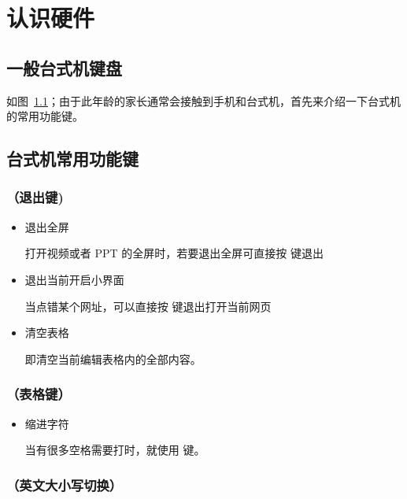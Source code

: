 \chapter{认识硬件}
\section{一般台式机键盘}
如图~\ref{fig:1}；由于此年龄的家长通常会接触到手机和台式机，首先来介绍一下台式机的常用功能键。
\section[台式机常用功能键]{台式机常用功能键\footnotemark}
\subsection{ （退出键)}
\begin{itemize}
	\item 退出全屏
	
	打开视频或者 PPT 的全屏时，若要退出全屏可直接按  键退出
	\item 退出当前开启小界面
	
	当点错某个网址，可以直接按  键退出打开当前网页
	\item 清空表格
	
	即清空当前编辑表格内的全部内容。
\end{itemize}
\begin{figure}
	\centering
	\caption{}
	\label{fig:1}
\end{figure}
\subsection{ （表格键）}
\begin{itemize}
	\item 缩进字符
	
	当有很多空格需要打时，就使用  键。
\end{itemize}
\subsection{ （英文大小写切换）}
